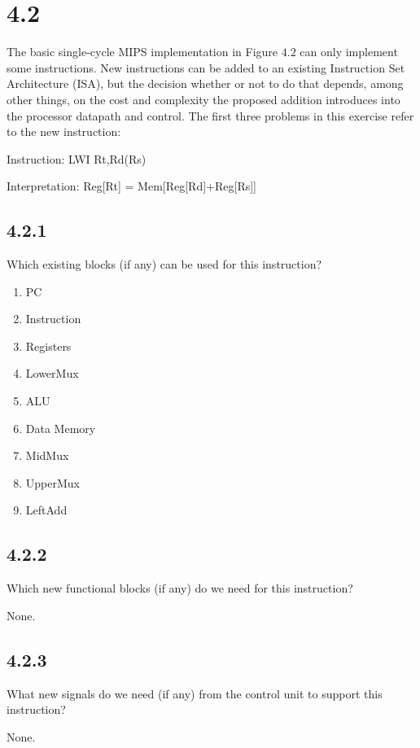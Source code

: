 \documentclass[paper=a4, fontsize=11pt]{scrartcl} %
\begin{document}
\section{4.2}

\begin{fancyquotes}
    The basic single-cycle MIPS implementation in Figure $4.2$ can only implement some instructions. New instructions can be added to an existing Instruction Set Architecture (ISA), but the decision whether or not to do that depends, among other things, on the cost and complexity the proposed addition introduces into the processor datapath and control. The first three problems in this exercise refer to the new instruction:

    Instruction: LWI Rt,Rd(Rs)

    Interpretation: Reg[Rt] = Mem[Reg[Rd]+Reg[Rs]]
\end{fancyquotes}

\subsection{4.2.1}

\begin{fancyquotes}
  Which existing blocks (if any) can be used for this instruction?
\end{fancyquotes}

\begin{enumerate}
  \item PC
  \item Instruction
  \item Registers
  \item LowerMux
  \item ALU
  \item Data Memory
  \item MidMux
  \item UpperMux
  \item LeftAdd
\end{enumerate}

\subsection{4.2.2}

\begin{fancyquotes}
  Which new functional blocks (if any) do we need for this instruction?
\end{fancyquotes}

None.

\subsection{4.2.3}

\begin{fancyquotes}
  What new signals do we need (if any) from the control unit to support this instruction?
\end{fancyquotes}

None.

\pagebreak


\end{document}
